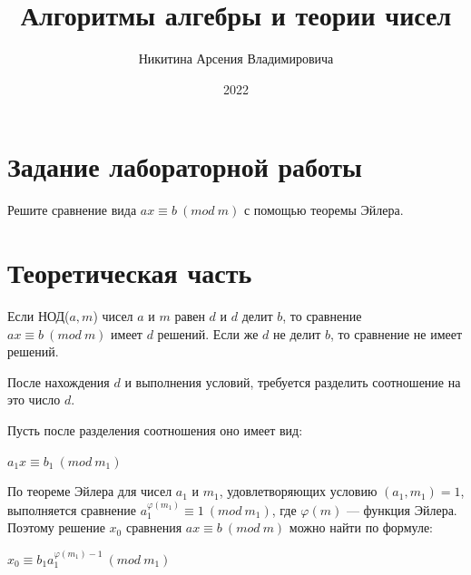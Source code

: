\documentclass[bachelor, och, labwork]{shiza}
\begin{document}
\title{Алгоритмы алгебры и теории чисел}





\author{Никитина Арсения Владимировича}




\date{2022}

\maketitle



\tableofcontents

\section{Задание лабораторной работы}

Решите сравнение вида $ax \equiv b ~(mod ~m)$ с помощью теоремы Эйлера.

\section{Теоретическая часть}

Если НОД($a, m$) чисел $a$ и $m$ равен $d$ и $d$ делит
$b$, то сравнение $ax \equiv b ~(mod ~m)$ имеет $d$ решений. Если же $d$ не делит 
$b$, то сравнение не имеет решений.

После нахождения $d$ и выполнения условий, требуется разделить соотношение на
это число $d$.

Пусть после разделения соотношения оно имеет вид:

\begin{center}
    $a_1x \equiv b_1 ~(mod ~ m_1)$
\end{center}


По теореме Эйлера для чисел $a_1$ и $m_1$, удовлетворяющих условию $(a_1, m_1) = 1$,
выполняется сравнение $a_1 ^ {\varphi(m_1)} \equiv 1 ~(mod~ m_1)$, где 
$\varphi(m)$ --- функция Эйлера. Поэтому решение $x_0$ сравнения 
$ax \equiv b ~(mod~ m)$ можно найти по формуле:

\begin{center}
    $x_0 \equiv b_1 a ^{\varphi(m_1)-1}_1 ~(mod ~m_1)$
\end{center}
\end{document}
